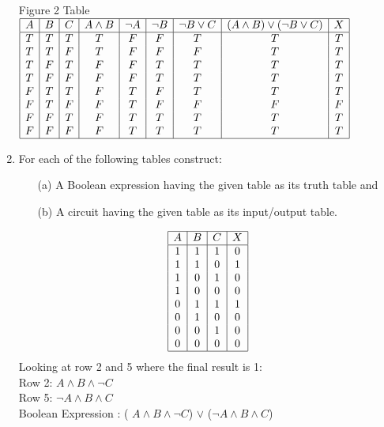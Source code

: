 \documentclass{article}
\begin{document}
\begin{enumerate}
Figure 2 Table \\ 
$
\begin{array}{|c|c|c|c|c|c|c|c|c|}
	\hline
	A & B & C & A \land B & \neg A & \neg B & \neg B \lor C & (A \land B) \lor (\neg B \lor C) & X \\
	\hline
	T & T & T & T & F & F & T & T & T \\
	T & T & F & T & F & F & F & T & T \\
	T & F & T & F & F & T & T & T & T \\
	T & F & F & F & F & T & T & T & T \\
	F & T & T & F & T & F & T & T & T \\
	F & T & F & F & T & F & F & F & F \\
	F & F & T & F & T & T & T & T & T \\
	F & F & F & F & T & T & T & T & T \\
	\hline
\end{array}
$
		 
		\item For each of the following tables construct:
		\begin{itemize}
			\item[(a)] A Boolean expression having the given table as its truth table and 
			\item[(b)] A circuit having the given table as its input/output table.
		\end{itemize}
		\[
		\begin{array}{|c|c|c|c|}
			\hline
			A & B & C & X \\
			\hline
			1 & 1 & 1 & 0 \\
			1 & 1 & 0 & 1 \\
			1 & 0 & 1 & 0 \\
			1 & 0 & 0 & 0 \\
			0 & 1 & 1 & 1 \\
			0 & 1 & 0 & 0 \\
			0 & 0 & 1 & 0 \\
			0 & 0 & 0 & 0 \\
			\hline
		\end{array}
		\]
		Looking at row 2 and 5 where the final result is 1: \\ 
		Row 2: $A \land B \land \neg C$ \\ 
		Row 5: $\neg A \land B \land C$ \\ 
		Boolean Expression : ( $A \land B \land \neg C$) $\lor$ ($\neg A \land B \land C$)
		

\end{enumerate}
\end{document}
